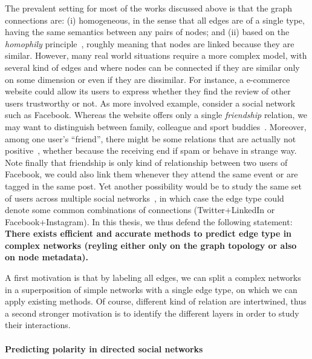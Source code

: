 The prevalent setting for most of the works discussed above is that the graph connections are: (i)
homogeneous, in the sense that all edges are of a single type, having the same semantics  between
any pairs of nodes; and (ii) based on the \emph{homophily} principle~\autocite{Homophily01}, roughly
meaning that nodes are linked because they are similar. However, many real world situations require
a more complex model, with several kind of edges and where nodes can be connected if they are
similar only on some dimension or even if they are dissimilar. For instance, a e-commerce website
could allow its users to express whether they find the review of other users trustworthy or not. As
more involved example, consider a social network such as Facebook. Whereas the website offers only a
single \emph{friendship} relation, we may want to distinguish between family, colleague and sport
buddies~\autocite{egoNips12}. Moreover, among one user's \enquote{friend}, there might be some
relations that are actually not positive~\autocite{Yang2012}, whether because the receiving end if
spam or behave in strange way. Note finally that friendship is only kind of relationship between two
users of Facebook, we could also link them whenever they attend the same event or are tagged in the
same post. Yet another possibility would be to study the same set of users across multiple social
networks~\autocite{mergingNetworks16}, in which case the edge type could denote some common
combinations of connections (\eg Twitter+LinkedIn or Facebook+Instagram). In this thesis, we thus
defend the following statement: \textbf{There exists efficient and accurate methods to predict edge
type in complex networks (reyling either only on the graph topology or also on node metadata).}

A first motivation is that by labeling all edges, we can split a complex networks in a superposition
of simple networks with a single edge type, on which we can apply existing methods. Of course,
different kind of relation are intertwined, thus a second stronger motivation is to identify the
different layers in order to study their interactions.

\vspace{-\baselineskip}
\paragraph{Predicting polarity in directed social networks}

